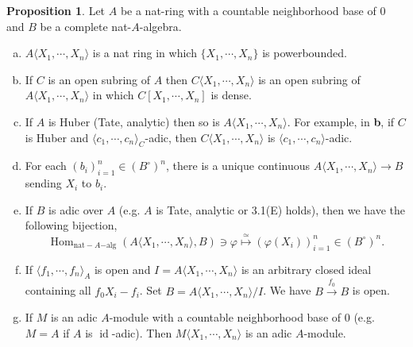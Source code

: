 \documentclass[10pt]{article}
\numberwithin{equation}{section}
\theoremstyle{definition}
\newtheorem{proposition}{Proposition}[subsection]
\DeclareMathOperator{\Hom}{Hom}
\DeclareMathOperator{\id}{id}
\newcommand{\comppol}[1]{\langle X_1,\cdots, X_{#1}\rangle}
\begin{document}
\begin{proposition}
    \label{proposition_20_3}
    Let $A$ be a nat-ring with a countable neighborhood base of $0$ and $B$ be a complete nat-$A$-algebra.
    \begin{enumerate}[a.]
        \item $A\langle X_1,\cdots,X_n\rangle$ is a nat ring in which $\{X_1,\cdots,X_n\}$ is powerbounded.
        \item If $C$ is an open subring of $A$ then $C\langle X_1,\cdots,X_n\rangle$ is an open subring of $A\langle X_1,\cdots,X_n\rangle$ in which $C[X_1,\cdots,X_n]$ is dense.
        \item If $A$ is Huber (Tate, analytic) then so is $A\langle X_1,\cdots,X_n\rangle$. For example, in \textbf{b}, if $C$ is Huber and $\langle c_1,\cdots,c_n\rangle_C$-adic, then $C\comppol{n}$ is $\langle c_1,\cdots,c_n\rangle$-adic.
        \item For each $(b_i)_{i=1}^n\in (B^{\circ})^n$, there is a unique continuous $A\comppol{n}\to B$ sending $X_i$ to $b_i$.
        \item If $B$ is adic over $A$ (e.g. $A$ is Tate, analytic or 3.1(E) holds), then we have the following bijection,
        \begin{equation*}
        \Hom_{\mathrm{nat-} A\mathrm{-alg}}(A\langle X_1,\cdots,X_n\rangle,B)\ni\varphi\stackrel{\simeq}{\mapsto}(\varphi(X_i))_{i=1}^n\in(B^\circ)^n.
        \end{equation*}
        \item If $\langle f_1,\cdots,f_n\rangle_A$ is open and $I=A\langle X_1,\cdots,X_n\rangle$ is an arbitrary closed ideal containing all $f_0X_i-f_i$. Set $B=A\langle X_1,\cdots,X_n\rangle/I$. We have $B\stackrel{f_0}{\to}B$ is open.
        \item If $M$ is an adic $A$-module with a countable neighborhood base of $0$ (e.g. $M=A$ if $A$ is $\id$-adic). Then $M\langle X_1,\cdots,X_n\rangle$ is an adic $A$-module.
    \end{enumerate}
\end{proposition}
\end{document}
